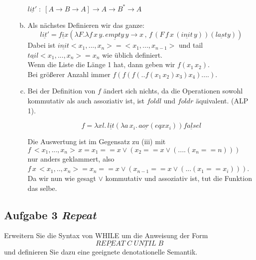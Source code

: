 \documentclass[11pt,a4paper,ngerman]{article}
\begin{document}
\begin{enumerate}[(i)]
\begin{enumerate}[a.]
            $\underline{lit'} \; : \; [A \rightarrow B \rightarrow A] \rightarrow A 
               \rightarrow B^* \rightarrow A$

         \item Als nächstes Definieren wir das ganze:\\
            $$
               \underline{lit'} = \underline{fix} \left( \lambda F. \lambda f \, x \, y .\,
                  \underline{empty} \, y \rightarrow x \, , \, f \, (F \, f \, x \, (\underline{init} \, y))
                     (\underline{last} y)
               \right)
            $$
            Dabei ist $\underline{init} <x_1,...,x_n> = <x_1,...,x_{n-1}>$ und
            tail $\underline{tail} <x_1,...,x_n> = x_n$ wie üblich definiert.\\
            Wenn die Liste die Länge 1 hat, dann geben wir $f (x_1 \, x_2)$.\\
            Bei größerer Anzahl immer $f(f(f(..f(x_1 \, x_2) x_3) x_4) ....)$.
  
         \item Bei der Definition von $f$ ändert sich nichts, da die Operationen sowohl
            kommutativ als auch assoziativ ist, ist $foldl$ und $foldr$ äquivalent. (ALP 1).
            
            $$
               f = \lambda x l. \, \underline{lit}
                  (\lambda a \, x_i. \, a \underline{or} (eq x x_i)) \underline{false} l
            $$

         Die Auswertung ist im Gegensatz zu (iii) mit\\
            $f \, <x_1,...,x_n> \, x= x_1 == x \lor (x_2 == x \lor ( .... (x_n == n)))$\\
         nur anders geklammert, also
            $f \, x \, <x_1,..,x_n> = x_n == x \lor (x_{n-1} == x \lor ( ... (x_1 == x_i)))$.\\
   
         Da wir nun wie gesagt $\lor$ kommutativ und assoziativ ist, tut die Funktion das selbe.
      \end{enumerate}

\end{enumerate}

\pagebreak

\subsection*{Aufgabe 3 \mdseries\itshape Repeat}

Erweitern Sie die Syntax von WHILE um die Anweisung der Form
$$
   \underline{REPEAT} \; C \; \underline{UNTIL} \; B
$$
und definieren Sie dazu eine geeignete denotationelle Semantik.\\
\end{document}
